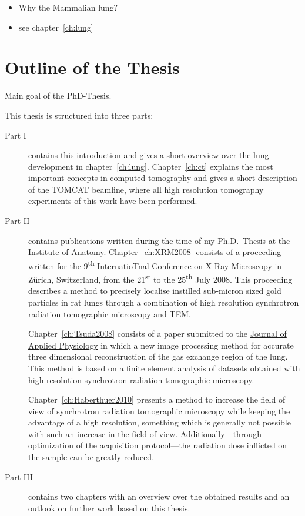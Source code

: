 \begin{itemize}
	\item Why the Mammalian lung?
	\item see chapter~\ref{ch:lung}
\end{itemize}

\section{Outline of the Thesis}
Main goal of the PhD-Thesis.

This thesis is structured into three parts:
\begin{description}
	\item[Part I] contains this introduction and gives a short overview over the lung development in chapter~\ref{ch:lung}. Chapter~\ref{ch:ct} explains the most important concepts in computed tomography and gives a short description of the \acf{TOMCAT} beamline, where all high resolution tomography experiments of this work have been performed.
	\item[Part II] contains publications written during the time of my Ph.D.\ Thesis at the Institute of Anatomy. Chapter~\ref{ch:XRM2008} consists of a proceeding written for the 9\textsuperscript{th} \href{http://xrm2008.web.psi.ch/}{InternatioTnal Conference on X-Ray Microscopy} in Zürich, Switzerland, from the 21\textsuperscript{st} to the 25\textsuperscript{th} July 2008. This proceeding describes a method to precisely localise instilled sub-micron sized gold particles in rat lungs through a combination of high resolution synchrotron radiation tomographic microscopy and \acl{TEM}.

Chapter~\ref{ch:Tsuda2008} consists of a paper submitted to the \href{http://jap.physiology.org/}{Journal of Applied Physiology} in which a new image processing method for accurate three dimensional reconstruction of the gas exchange region of the lung. This method is based on a finite element analysis of datasets obtained with high resolution synchrotron radiation tomographic microscopy.

Chapter~\ref{ch:Haberthuer2010} presents a method to increase the field of view of synchrotron radiation tomographic microscopy while keeping the advantage of a high resolution, something which is generally not possible with such an increase in the field of view. Additionally---through optimization of the acquisition protocol---the radiation dose inflicted on the sample can be greatly reduced.

	\item[Part III] contains two chapters with an overview over the obtained results and an outlook on further work based on this thesis.
\end{description}